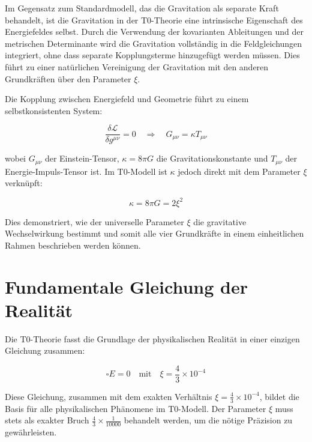 \documentclass[12pt,a4paper]{article}
\theoremstyle{definition}
\begin{document}
	\begin{wichtig}
		Im Gegensatz zum Standardmodell, das die Gravitation als separate Kraft behandelt, ist die Gravitation in der T0-Theorie eine intrinsische Eigenschaft des Energiefeldes selbst. Durch die Verwendung der kovarianten Ableitungen und der metrischen Determinante wird die Gravitation vollständig in die Feldgleichungen integriert, ohne dass separate Kopplungsterme hinzugefügt werden müssen. Dies führt zu einer natürlichen Vereinigung der Gravitation mit den anderen Grundkräften über den Parameter $\xi$.
	\end{wichtig}
	
	\begin{verhaltnis}
		Die Kopplung zwischen Energiefeld und Geometrie führt zu einem selbstkonsistenten System:
		
		\begin{equation}
			\frac{\delta\mathcal{L}}{\delta g^{\mu\nu}} = 0 \quad \Rightarrow \quad G_{\mu\nu} = \kappa T_{\mu\nu}
		\end{equation}
		
		wobei $G_{\mu\nu}$ der Einstein-Tensor, $\kappa = 8\pi G$ die Gravitationskonstante und $T_{\mu\nu}$ der Energie-Impuls-Tensor ist. Im T0-Modell ist $\kappa$ jedoch direkt mit dem Parameter $\xi$ verknüpft:
		
		\begin{equation}
			\kappa = 8\pi G = 2\xi^2
		\end{equation}
		
		Dies demonstriert, wie der universelle Parameter $\xi$ die gravitative Wechselwirkung bestimmt und somit alle vier Grundkräfte in einem einheitlichen Rahmen beschrieben werden können.
	\end{verhaltnis}
	
	\section{Fundamentale Gleichung der Realität}
	
	Die T0-Theorie fasst die Grundlage der physikalischen Realität in einer einzigen Gleichung zusammen:
	
	\begin{equation}
		\boxed{\square E = 0 \quad \text{mit} \quad \xi = \frac{4}{3} \times 10^{-4}}
	\end{equation}
	
	\begin{wichtig}
		Diese Gleichung, zusammen mit dem exakten Verhältnis $\xi = \frac{4}{3} \times 10^{-4}$, bildet die Basis für alle physikalischen Phänomene im T0-Modell. Der Parameter $\xi$ muss stets als exakter Bruch $\frac{4}{3} \times \frac{1}{10000}$ behandelt werden, um die nötige Präzision zu gewährleisten.
	\end{wichtig}
	
\end{document}
